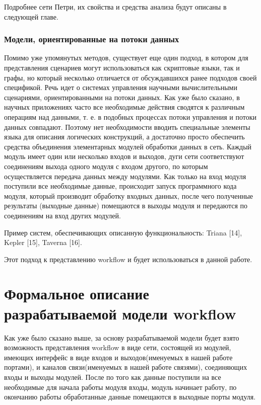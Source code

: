 \documentclass[a4paper,12pt]{article}
\begin{document}
Подробнее сети Петри, их свойства и средства анализа будут описаны в следующей главе.

\subsubsection{Модели, ориентированные на потоки данных}
Помимо уже упомянутых методов, существует еще один подход, в котором для представления сценариев могут использоваться как скриптовые
языки, так и графы, но который несколько отличается от обсуждавшихся
ранее подходов своей спецификой.
Речь идет о системах управления научными вычислительными сценариями, ориентированными на потоки данных. Как уже было сказано,
в научных приложениях часто все необходимые действия сводятся к различным операциям над данными, т. е. в подобных процессах потоки
управления и потоки данных совпадают. Поэтому нет необходимости вводить специальные элементы языка для описания логических конструкций, а достаточно просто обеспечить средства объединения элементарных модулей обработки данных в сеть. Каждый модуль имеет один или несколько входов и выходов, дуги сети соответствуют соединениям выхода одного
модуля с входом другого, по которым осуществляется передача данных
между модулями. Как только на вход модуля поступили все необходимые данные, происходит запуск программного кода модуля, который производит обработку входных данных, после чего полученные результаты (выходные данные) помещаются в выходы модуля и передаются по соединениям на вход других модулей. 


Пример систем, обеспечивающих описанную функциональность: Triana [14], Kepler [15], Taverna [16].

Этот подход к представлению workflow и будет использоваться в данной работе.

\section{Формальное описание разрабатываемой модели workflow}
Как уже было сказано выше, за основу разрабатываемой модели будет взято возможность представления workflow в виде сети, состоящей из модулей, имеющих интерфейс в виде входов и выходов(именуемых в нашей работе портами), и каналов связи(именуемых в нашей работе связями), соединяющих входы и выходы модулей. После по того как данные поступили на все необходимые для начала работы модуля входы, модуль начинает работу, по окончанию работы обработанные данные помещаются в выходные порты модуля.\\
\end{document}
